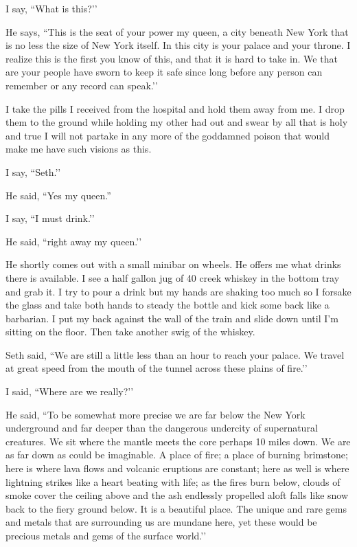 I say, ``What is this?’’

He says, ``This is the seat of your power my queen, a city beneath New York that is no less the size of New York itself. In this city is your palace and your throne. I realize this is the first you know of this, and that it is hard to take in. We that are your people have sworn to keep it safe since long before any person can remember or any record can speak.’’

I take the pills I received from the hospital and hold them away from me. I drop them to the ground while holding my other had out and swear by all that is holy and true I will not partake in any more of the goddamned poison that would make me have such visions as this.

I say, ``Seth.’’

He said, ``Yes my queen.”

I say, ``I must drink.’’

He said, ``right away my queen.’’

He shortly comes out with a small minibar on wheels. He offers me what drinks there is available. I see a half gallon jug of 40 creek whiskey in the bottom tray and grab it. I try to pour a drink but my hands are shaking too much so I forsake the glass and take both hands to steady the bottle and kick some back like a barbarian. I put my back against the wall of the train and slide down until I’m sitting on the floor. Then take another swig of the whiskey.

Seth said, ``We are still a little less than an hour to reach your palace. We travel at great speed from the mouth of the tunnel across these plains of fire.’’

I said, ``Where are we really?’’

He said, ``To be somewhat more precise we are far below the New York underground and far deeper than the dangerous undercity of supernatural creatures. We sit where the mantle meets the core perhaps 10 miles down. We are as far down as could be imaginable. A place of fire; a place of burning brimstone; here is where lava flows and volcanic eruptions are constant; here as well is where lightning strikes like a heart beating with life; as the fires burn below, clouds of smoke cover the ceiling above and the ash endlessly propelled aloft falls like snow back to the fiery ground below. It is a beautiful place. The unique and rare gems and metals that are surrounding us are mundane here, yet these would be precious metals and gems of the surface world.’’


